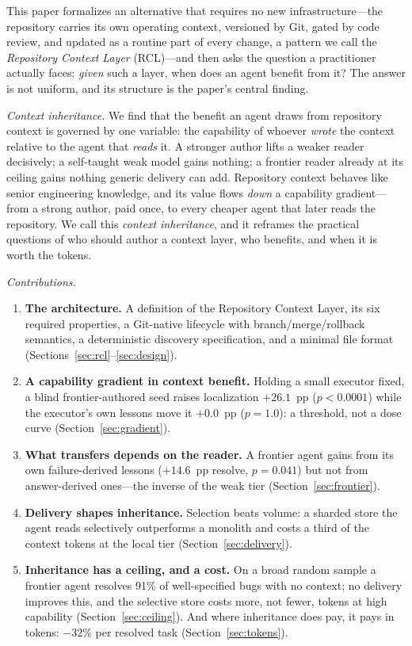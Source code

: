 \documentclass[sigconf,nonacm]{acmart}
\begin{document}
This paper formalizes an alternative that requires no new infrastructure---the
repository carries its own operating context, versioned by Git, gated by code
review, and updated as a routine part of every change, a pattern we call the
\emph{Repository Context Layer} (RCL)---and then asks the question a practitioner
actually faces: \emph{given} such a layer, when does an agent benefit from it? The
answer is not uniform, and its structure is the paper's central finding.

\emph{Context inheritance.} We find that the benefit an agent draws from
repository context is governed by one variable: the capability of whoever
\emph{wrote} the context relative to the agent that \emph{reads} it. A stronger
author lifts a weaker reader decisively; a self-taught weak model gains nothing;
a frontier reader already at its ceiling gains nothing generic delivery can add.
Repository context behaves like senior engineering knowledge, and its value flows
\emph{down} a capability gradient---from a strong author, paid once, to every
cheaper agent that later reads the repository. We call this \emph{context
inheritance}, and it reframes the practical questions of who should author a
context layer, who benefits, and when it is worth the tokens.

\emph{Contributions.}
\begin{enumerate}
\item \textbf{The architecture.} A definition of the Repository Context Layer, its
six required properties, a Git-native lifecycle with branch/merge/rollback
semantics, a deterministic discovery specification, and a minimal file format
(Sections~\ref{sec:rcl}--\ref{sec:design}).
\item \textbf{A capability gradient in context benefit.} Holding a small executor
fixed, a blind frontier-authored seed raises localization $+26.1$~pp
($p < 0.0001$) while the executor's own lessons move it $+0.0$~pp ($p = 1.0$): a
threshold, not a dose curve (Section~\ref{sec:gradient}).
\item \textbf{What transfers depends on the reader.} A frontier agent gains from
its own failure-derived lessons ($+14.6$~pp resolve, $p = 0.041$) but not from
answer-derived ones---the inverse of the weak tier (Section~\ref{sec:frontier}).
\item \textbf{Delivery shapes inheritance.} Selection beats volume: a sharded
store the agent reads selectively outperforms a monolith and costs a third of the
context tokens at the local tier (Section~\ref{sec:delivery}).
\item \textbf{Inheritance has a ceiling, and a cost.} On a broad random sample a
frontier agent resolves 91\% of well-specified bugs with no context; no delivery
improves this, and the selective store costs more, not fewer, tokens at high
capability (Section~\ref{sec:ceiling}). And where inheritance does pay, it pays in
tokens: $-32\%$ per resolved task (Section~\ref{sec:tokens}).
\end{enumerate}
\end{document}
